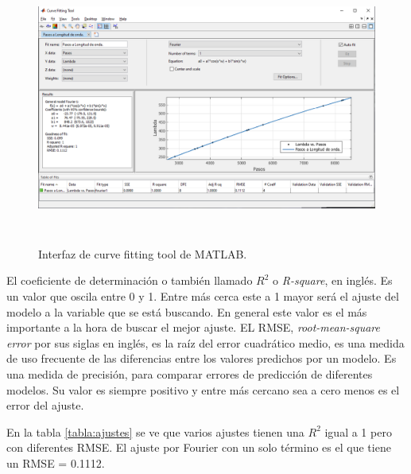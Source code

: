 \begin{figure}[h]
	\centering
	\includegraphics[width=1\linewidth,height=9cm]{Imagenes/3/curving}
	\caption{Interfaz de curve fitting tool de MATLAB.}
	\label{fig:curving}
\end{figure}
El coeficiente de determinación o también llamado $R^{2}$ o \textit{R-square}, en inglés. Es un valor que oscila entre 0 y 1. Entre más cerca este a 1 mayor será el ajuste del modelo a la variable que se está buscando. En general este valor es el más importante a la hora de buscar el mejor ajuste. EL RMSE, \textit{root-mean-square error} por sus siglas en inglés, es la raíz del error cuadrático medio, es una medida de uso frecuente de las diferencias entre los valores predichos por un modelo. Es una medida de precisión, para comparar errores de predicción de diferentes modelos. Su valor es siempre positivo y entre más cercano sea a cero menos es el error del ajuste.

En la tabla \ref{tabla:ajustes} se ve que varios ajustes tienen una \textit{$R^{2}$} igual a 1 pero con diferentes RMSE. El ajuste por Fourier con un solo término es el que tiene un RMSE = 0.1112.

